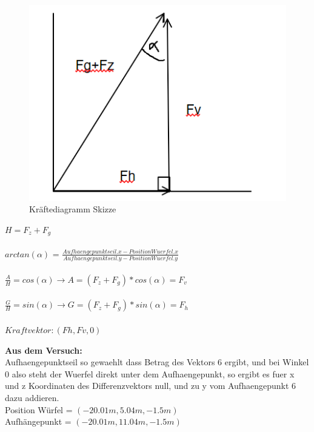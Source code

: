 \documentclass[../main.tex]{subfiles}
\begin{document}
     \begin{figure}[H]
               \begin{center}
                   \centerline{\includegraphics[width=155mm]{./images/Lab3Unity/KraefteDiagramm.png}}
                   \caption{Kräftediagramm Skizze}
                   \label{fig:KräfteDiagramm}
               \end{center}
     \end{figure}
\begin{mdframed}
$H = F_z +F_g$\\\\
$arctan(\alpha)$ = $\frac{Aufhaengepunktseil.x-Position Wuerfel.x }{Aufhaengepunktseil.y-Position Wuerfel.y }$\\\\
$\frac{A}{H}= cos(\alpha) \rightarrow A = (F_z + F_g) * cos(\alpha)= F_v$\\\\
$\frac{G}{H}= sin(\alpha) \rightarrow G = (F_z + F_g) * sin(\alpha)= F_h$\\\\
$Kraftvektor: (Fh,Fv,0)$
\end{mdframed}
\textbf {Aus dem Versuch:\\}
Aufhaengepunktseil so gewaehlt dass Betrag des Vektors 6 ergibt, und bei Winkel 0 also steht der Wuerfel direkt unter dem Aufhaengepunkt, so ergibt es fuer x und z Koordinaten des Differenzvektors null, und zu y vom Aufhaengepunkt 6 dazu addieren.\\
Position Würfel = $(-20.01m,5.04m,-1.5m)$\\
Aufhängepunkt = $(-20.01m,11.04m,-1.5m)$\\
\end{document}
